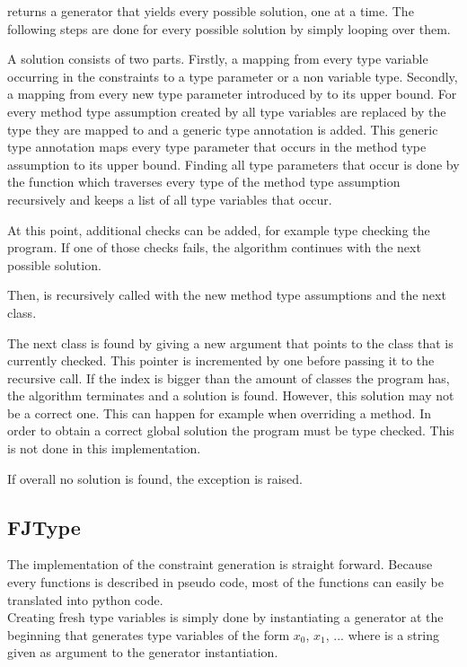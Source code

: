  returns a generator that yields every possible solution, one at a time. The following steps are done for every possible solution by simply looping over them.

A solution consists of two parts. Firstly, a mapping from every type variable occurring in the constraints to a type parameter or a non variable type. Secondly, a mapping from every new type parameter introduced by  to its upper bound.
For every method type assumption created by  all type variables are replaced by the type they are mapped to and
a generic type annotation is added. This generic type annotation maps every type parameter that occurs in the method type assumption to its upper bound.
Finding all type parameters that occur is done by the function  which traverses every type of the method type assumption recursively and keeps a list of all type variables that occur.

At this point, additional checks can be added, for example type checking the program. If one of those checks fails, the algorithm continues with the next possible solution.

Then,  is recursively called with the new method type assumptions and the next class.

The next class is found by giving  a new argument  that points to the class that is currently checked. This pointer is incremented by one before passing it to the recursive call.
If the index is bigger than the amount of classes the program has, the algorithm terminates and a solution is found.
However, this solution may not be a correct one. This can happen for example when overriding a method. In order to obtain a correct global solution
the program must be type checked. This is not done in this implementation.

If overall no solution is found, the exception  is raised.

\subsection{FJType}
The implementation of the constraint generation is straight forward. Because every functions is described in pseudo code, most of the functions can easily be translated into python code. \\
Creating fresh type variables is simply done by instantiating a generator at the beginning that generates type variables of the form $x_0$, $x_1$, ... where  is a string given as argument to the generator instantiation. \\

